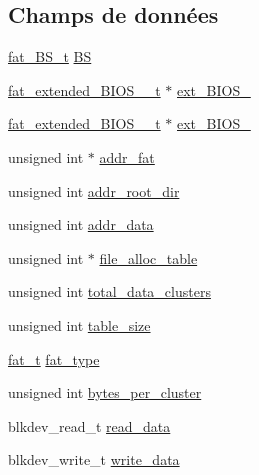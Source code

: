 \subsection*{\-Champs de données}
\begin{DoxyCompactItemize}
\item 
\hyperlink{fat__internal_8h_a2fa84596abf5ea3bd6f27951a77333c5}{fat\-\_\-\-B\-S\-\_\-t} \hyperlink{struct__fat__info_adcd12930a4a7f94ecac42ba82567adb7}{\-B\-S}
\item 
\hyperlink{fat__internal_8h_a017a64d5b6e25780d01109008245c15c}{fat\-\_\-extended\-\_\-\-B\-I\-O\-S\-\_\-\_\-t} $\ast$ \hyperlink{struct__fat__info_a4da4c2a7a629ca59a686822e6447acb8}{ext\-\_\-\-B\-I\-O\-S\-\_}
\item 
\hyperlink{fat__internal_8h_ac3feb4afc4c75c10410e9e867e3f99e8}{fat\-\_\-extended\-\_\-\-B\-I\-O\-S\-\_\-\_\-t} $\ast$ \hyperlink{struct__fat__info_aab203e7eb3c2027e3034d7765a2d5281}{ext\-\_\-\-B\-I\-O\-S\-\_}
\item 
unsigned int $\ast$ \hyperlink{struct__fat__info_a0344193eb413dce4369b6e36ed03b92b}{addr\-\_\-fat}
\item 
unsigned int \hyperlink{struct__fat__info_ae9133d320e0afc89c5e6cc9cedf6dfb5}{addr\-\_\-root\-\_\-dir}
\item 
unsigned int \hyperlink{struct__fat__info_a4cb2766e74dd65f24d4eb30ce3b49302}{addr\-\_\-data}
\item 
unsigned int $\ast$ \hyperlink{struct__fat__info_a27195d09eb1dcd65d35d7b312d1bec0b}{file\-\_\-alloc\-\_\-table}
\item 
unsigned int \hyperlink{struct__fat__info_ab43681d4b5c7cf719cd6c934cada39e3}{total\-\_\-data\-\_\-clusters}
\item 
unsigned int \hyperlink{struct__fat__info_af110757af771c0f3fe0c515cca1ff177}{table\-\_\-size}
\item 
\hyperlink{fat__internal_8h_aea47744930623076e66d2f155e12ca24}{fat\-\_\-t} \hyperlink{struct__fat__info_af9e994d6d2c5211614ca61cfa4492500}{fat\-\_\-type}
\item 
unsigned int \hyperlink{struct__fat__info_ac1ba92d928512827ab7978f136efda96}{bytes\-\_\-per\-\_\-cluster}
\item 
blkdev\-\_\-read\-\_\-t \hyperlink{struct__fat__info_a443e425e86f7401bed57670103d74cf2}{read\-\_\-data}
\item 
blkdev\-\_\-write\-\_\-t \hyperlink{struct__fat__info_a419699acceacb59718e0b1f9262de102}{write\-\_\-data}
\end{DoxyCompactItemize}


